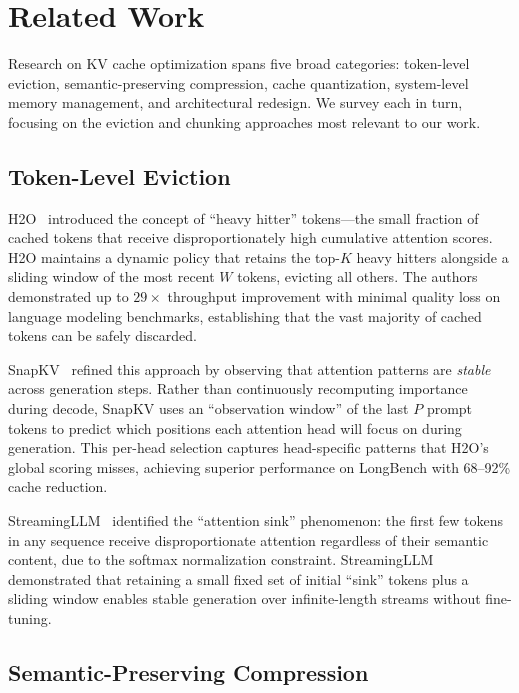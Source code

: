 \documentclass[conference]{IEEEtran}
\begin{document}
\section{Related Work}

Research on KV cache optimization spans five broad categories: token-level eviction, semantic-preserving compression, cache quantization, system-level memory management, and architectural redesign. We survey each in turn, focusing on the eviction and chunking approaches most relevant to our work.

\subsection{Token-Level Eviction}

H2O~\cite{h2o} introduced the concept of ``heavy hitter'' tokens---the small fraction of cached tokens that receive disproportionately high cumulative attention scores. H2O maintains a dynamic policy that retains the top-$K$ heavy hitters alongside a sliding window of the most recent $W$ tokens, evicting all others. The authors demonstrated up to $29\times$ throughput improvement with minimal quality loss on language modeling benchmarks, establishing that the vast majority of cached tokens can be safely discarded.

SnapKV~\cite{snapkv} refined this approach by observing that attention patterns are \textit{stable} across generation steps. Rather than continuously recomputing importance during decode, SnapKV uses an ``observation window'' of the last $P$ prompt tokens to predict which positions each attention head will focus on during generation. This per-head selection captures head-specific patterns that H2O's global scoring misses, achieving superior performance on LongBench with 68--92\% cache reduction.

StreamingLLM~\cite{streamingllm} identified the ``attention sink'' phenomenon: the first few tokens in any sequence receive disproportionate attention regardless of their semantic content, due to the softmax normalization constraint. StreamingLLM demonstrated that retaining a small fixed set of initial ``sink'' tokens plus a sliding window enables stable generation over infinite-length streams without fine-tuning.

\subsection{Semantic-Preserving Compression}
\end{document}
